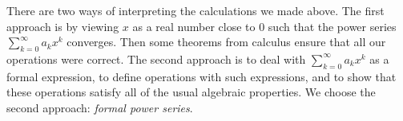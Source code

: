 

\setcounter{section}{2}
\setcounter{subsection}{2}
\setcounter{dfn}{0}

\label{sec:OperFPS}
There are two ways of interpreting the calculations we made above.
The first approach is by viewing $x$ as a real number close to $0$ such that the power series $\sum_{k=0}^\infty a_k x^k$ converges.
Then some theorems from calculus ensure that all our operations were correct.
The second approach is to deal with $\sum_{k=0}^\infty a_k x^k$ as a formal expression,
to define operations with such expressions, and to show that these operations satisfy all of the usual algebraic properties.
We choose the second approach: \emph{formal power series}.




